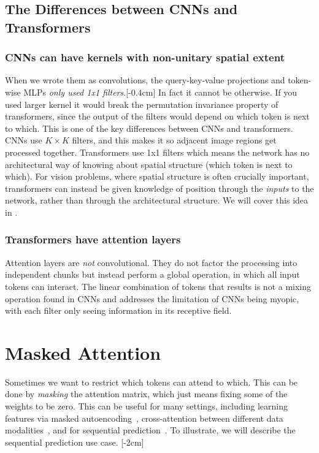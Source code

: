 \subsection{The Differences between CNNs and Transformers}

\subsubsection{CNNs can have kernels with non-unitary spatial extent}
When we wrote them as convolutions, the query-key-value projections and token-wise MLPs \textit{only used 1x1 filters}.[-0.4cm] In fact it cannot be otherwise. If you used larger kernel it would break the permutation invariance property of transformers, since the output of the filters would depend on which token is next to which. This is one of the key differences between CNNs and transformers. CNNs use $K \times K$ filters, and this makes it so adjacent image regions get processed together. Transformers use 1x1 filters which means the network has no architectural way of knowing about spatial structure (which token is next to which). For vision problems, where spatial structure is often crucially important, transformers can instead be given knowledge of position through the \textit{inputs} to the network, rather than through the architectural structure. We will cover this idea in \sect{\ref{sec:transformers:positional_encodings}}.

\subsubsection{Transformers have attention layers}
Attention layers are \textit{not} convolutional. They do not factor the processing into independent chunks but instead perform a global operation, in which all input tokens can interact. The linear combination of tokens that results is not a mixing operation found in CNNs and addresses the limitation of CNNs being myopic, with each filter only seeing information in its receptive field.


\section{Masked Attention}\label{sec:transformers:masked_attention}
Sometimes we want to restrict which tokens can attend to which. This can be done by \textit{masking} the attention matrix, which just means fixing some of the weights to be zero. This can be useful for many settings, including learning features via masked autoencoding~\cite{he2022masked}, cross-attention between different data modalities~\cite{wei2020multi}, and for sequential prediction~\cite{chen2020generative}. To illustrate, we will describe the sequential prediction use case.
[-2cm]


